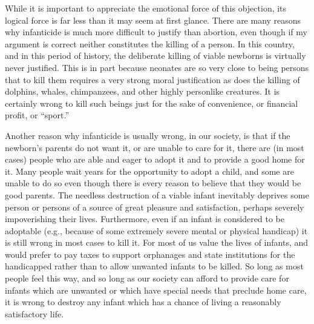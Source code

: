 While it is important to appreciate the emotional force of
this objection, its logical force is far less than it may seem
at first glance. There are many reasons why infanticide is
much more difficult to justify than abortion, even though
if my argument is correct neither constitutes the killing of
a person. In this country, and in this period of history, the
deliberate killing of viable newborns is virtually never
justified. This is in part because neonates are so very
close to being persons that to kill them requires a very
strong moral justification as does the killing of dolphins,
whales, chimpanzees, and other highly personlike
creatures. It is certainly wrong to kill such beings just for
the sake of convenience, or financial profit, or “sport.”

Another reason why infanticide is usually wrong, in our
society, is that if the newborn’s parents do not want it, or
are unable to care for it, there are (in most cases) people
who are able and eager to adopt it and to provide a good
home for it. Many people wait years for the opportunity to
adopt a child, and some are unable to do so even though
there is every reason to believe that they would be good
parents. The needless destruction of a viable infant
inevitably deprives some person or persons of a source of
great pleasure and satisfaction, perhaps severely
impoverishing their lives. Furthermore, even if an infant
is considered to be adoptable (e.g., because of some
extremely severe mental or physical handicap) it is still
wrong in most cases to kill it. For most of us value the
lives of infants, and would prefer to pay taxes to support
orphanages and state institutions for the handicapped
rather than to allow unwanted infants to be killed. So long
as most people feel this way, and so long as our society
can afford to provide care for infants which are unwanted
or which have special needs that preclude home care, it is
wrong to destroy any infant which has a chance of living
a reasonably satisfactory life.

